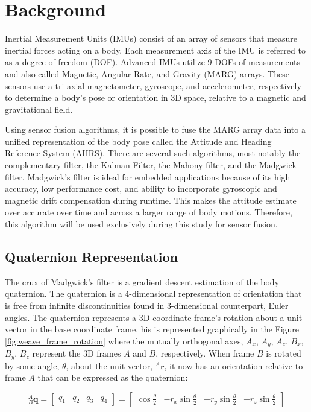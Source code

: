 \section{Background}
Inertial Measurement Units (IMUs) consist of an array of sensors that measure inertial forces acting on a body. 
Each measurement axis of the IMU is referred to as a degree of freedom (DOF). 
Advanced IMUs utilize 9 DOFs of measurements and also called Magnetic, Angular Rate, and Gravity (MARG) arrays. 
These sensors use a tri-axial magnetometer, gyroscope, and accelerometer, respectively to determine a body’s pose or orientation in 3D space, relative to a magnetic and gravitational field.

Using sensor fusion algorithms, it is possible to fuse the MARG array data into a unified representation of the body pose called the Attitude and Heading Reference System (AHRS). 
There are several such algorithms, most notably the complementary filter, the Kalman Filter, the Mahony filter, and the Madgwick filter. 
Madgwick’s filter is ideal for embedded applications because of its high accuracy, low performance cost, and ability to incorporate gyroscopic and magnetic drift compensation during runtime. 
This makes the attitude estimate over accurate over time and across a larger range of body motions. 
Therefore, this algorithm will be used exclusively during this study for sensor fusion.

\subsection{Quaternion Representation}

The crux of Madgwick’s filter is a gradient descent estimation of the body quaternion. 
The quaternion is a 4-dimensional representation of orientation that is free from infinite discontinuities found in 3-dimensional counterpart, Euler angles. 
The quaternion represents a 3D coordinate frame’s rotation about a unit vector in the base coordinate frame. 
his is represented graphically in the Figure \ref{fig:weave_frame_rotation} where the mutually orthogonal axes, $A_x$, $A_y$, $A_z$, $B_x$, $B_y$, $B_z$ represent the 3D frames $A$ and $B$, respectively.
When frame $B$ is rotated by some angle, $\theta$, about the unit vector, ${}^A \pmb{r}$, it now has an orientation relative to frame $A$ that can be expressed as the quaternion:

\begin{equation}
    {}^A_B\textbf{q} = \begin{bmatrix} q_1 & q_2 & q_3 & q_4 \end{bmatrix} = \begin{bmatrix} \cos\frac{\theta}{2} & -r_x\sin\frac{\theta}{2} & -r_y\sin\frac{\theta}{2} & -r_z\sin\frac{\theta}{2} \end{bmatrix}
\end{equation}

